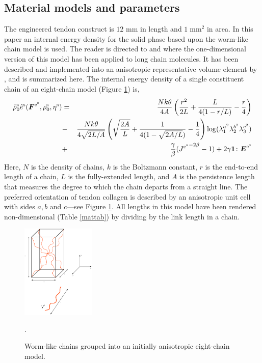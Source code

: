 \subsection{Material models and parameters}\label{sect6.1}

The engineered tendon construct is $12$ mm in length and
$1\;\mathrm{mm}^2$ in area. In this paper an internal energy
density for the solid phase based upon the worm-like chain model
is used. The reader is directed to \citet{Riefetal:97} and
\cite{Bustamanteetal:2003} where the one-dimensional version of
this model has been applied to long chain molecules. It has been
described and implemented into an anisotropic representative
volume element by \citet{Bischoffetal:2002}, and is summarized
here. The internal energy density of a single constituent chain of
an eight-chain model (Figure \ref{eightchain}) is,
\begin{eqnarray}
\bar{\rho}_0^\mathrm{s}\hat{e}^\mathrm{s}(\mbox{\boldmath$ F$}^{\mathrm{e}^\mathrm{s}},\rho_0^\mathrm{s},\eta^\mathrm{s})
&=& \frac{N k \theta}{4 A}\left(\frac{r^2}{2L} +
\frac{L}{4(1-r/L)} -
\frac{r}{4}\right)\nonumber\\
&-&\frac{N k \theta}{4\sqrt{2L/A}}\left(\sqrt{\frac{2A}{L}} +
\frac{1}{4(1 - \sqrt{2A/L})} -\frac{1}{4} \right)\log(\lambda_1^{a^2}\lambda_2^{b^2}\lambda_3^{c^2})\nonumber\\
&+& \frac{\gamma}{\beta}({J^{\mathrm{e}^\mathrm{s}}}^{-2\beta} -1)
+ 2\gamma{\bf 1}\colon\mbox{\boldmath$ E$}^{\mathrm{e}^\mathrm{s}} \label{wlcmeq}
\end{eqnarray}
\noindent Here, $N$ is the density of chains, $k$ is the Boltzmann
constant, $r$ is the end-to-end length of a chain, $L$ is the
fully-extended length, and $A$ is the persistence length that
measures the degree to which the chain departs from a straight
line. The preferred orientation of tendon collagen is described by
an anisotropic unit cell with sides $a,b$ and $c$---see Figure
\ref{eightchain}. All lengths in this model have been rendered
non-dimensional (Table \ref{mattab}) by dividing by the link
length in a chain.
\begin{figure}[ht]
   \centering
{\includegraphics[width=3.5cm]{images/wlcm-cuboid.eps}} \caption{Worm-like
chains grouped into an initially anisotropic eight-chain model.}
\label{eightchain}.
\end{figure}

